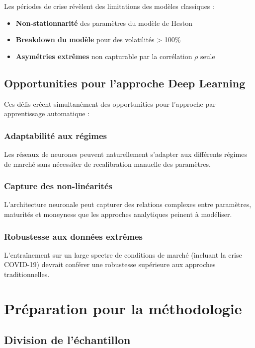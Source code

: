 \begin{table}[H]
\begin{table}[H]
\begin{table}[H]
\begin{table}[H]
Les périodes de crise révèlent des limitations des modèles classiques :
\begin{itemize}
\item \textbf{Non-stationnarité} des paramètres du modèle de Heston
\item \textbf{Breakdown du modèle} pour des volatilités > 100\%
\item \textbf{Asymétries extrêmes} non capturable par la corrélation $\rho$ seule
\end{itemize}

\subsection{Opportunities pour l'approche Deep Learning}

Ces défis créent simultanément des opportunities pour l'approche par apprentissage automatique :

\subsubsection{Adaptabilité aux régimes}

Les réseaux de neurones peuvent naturellement s'adapter aux différents régimes de marché sans nécessiter de recalibration manuelle des paramètres.

\subsubsection{Capture des non-linéarités}

L'architecture neuronale peut capturer des relations complexes entre paramètres, maturités et moneyness que les approches analytiques peinent à modéliser.

\subsubsection{Robustesse aux données extrêmes}

L'entraînement sur un large spectre de conditions de marché (incluant la crise COVID-19) devrait conférer une robustesse supérieure aux approches traditionnelles.

\section{Préparation pour la méthodologie}

\subsection{Division de l'échantillon}


\end{table}
\end{table}
\end{table}
\end{table}
